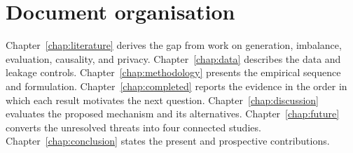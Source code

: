 \section{Document organisation}

Chapter~\ref{chap:literature} derives the gap from work on generation, imbalance, evaluation, causality, and privacy. Chapter~\ref{chap:data} describes the data and leakage controls. Chapter~\ref{chap:methodology} presents the empirical sequence and \sepa{} formulation. Chapter~\ref{chap:completed} reports the evidence in the order in which each result motivates the next question. Chapter~\ref{chap:discussion} evaluates the proposed mechanism and its alternatives. Chapter~\ref{chap:future} converts the unresolved threats into four connected studies. Chapter~\ref{chap:conclusion} states the present and prospective contributions.
